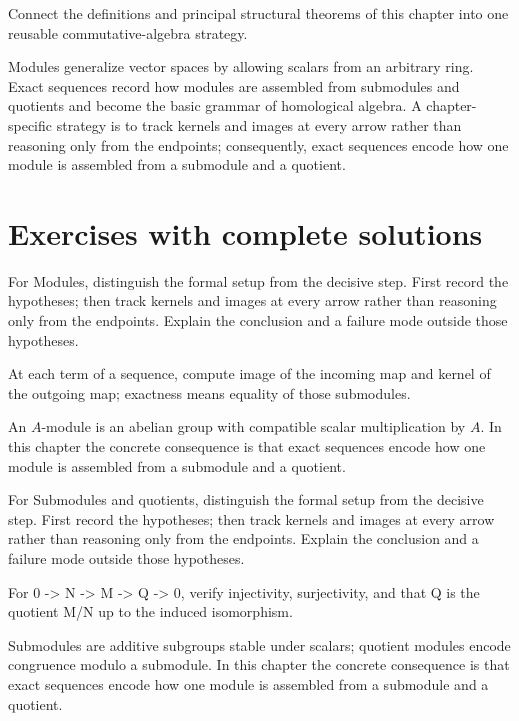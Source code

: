\begin{problem}\label{prob:v09-problem-12}
Connect the definitions and principal structural theorems of this chapter into one reusable commutative-algebra strategy.
\end{problem}
\begin{solution}
Modules generalize vector spaces by allowing scalars from an arbitrary ring. Exact sequences record how modules are assembled from submodules and quotients and become the basic grammar of homological algebra. A chapter-specific strategy is to track kernels and images at every arrow rather than reasoning only from the endpoints; consequently, exact sequences encode how one module is assembled from a submodule and a quotient.
\end{solution}

\section{Exercises with complete solutions}

\begin{exercise}\label{exr:v09-01}
For Modules, distinguish the formal setup from the decisive step. First record the hypotheses; then track kernels and images at every arrow rather than reasoning only from the endpoints. Explain the conclusion and a failure mode outside those hypotheses.
\end{exercise}
\begin{hint}
At each term of a sequence, compute image of the incoming map and kernel of the outgoing map; exactness means equality of those submodules.
\end{hint}
\begin{solution}
An $A$-module is an abelian group with compatible scalar multiplication by $A$. In this chapter the concrete consequence is that exact sequences encode how one module is assembled from a submodule and a quotient.
\end{solution}

\begin{exercise}\label{exr:v09-02}
For Submodules and quotients, distinguish the formal setup from the decisive step. First record the hypotheses; then track kernels and images at every arrow rather than reasoning only from the endpoints. Explain the conclusion and a failure mode outside those hypotheses.
\end{exercise}
\begin{hint}
For 0 -> N -> M -> Q -> 0, verify injectivity, surjectivity, and that Q is the quotient M/N up to the induced isomorphism.
\end{hint}
\begin{solution}
Submodules are additive subgroups stable under scalars; quotient modules encode congruence modulo a submodule. In this chapter the concrete consequence is that exact sequences encode how one module is assembled from a submodule and a quotient.
\end{solution}


